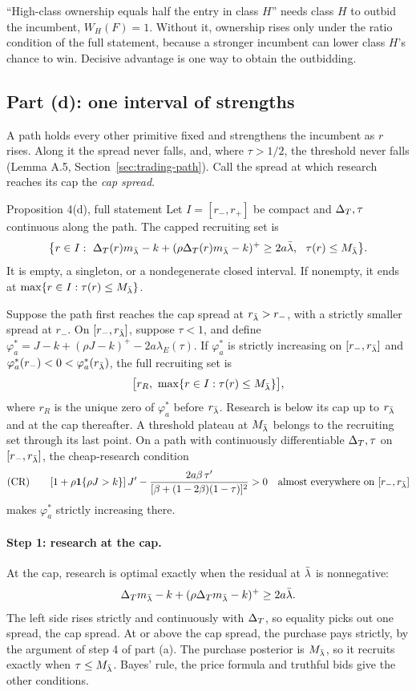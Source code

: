\begin{watchout}
``High-class ownership equals half the entry in class \(H\)'' needs class \(H\) to outbid the incumbent,
\(W_H(F)=1\). Without it, ownership rises only under the ratio condition of the full statement, because a stronger
incumbent can lower class \(H\)'s chance to win. Decisive advantage is one way to obtain the outbidding.
\end{watchout}

\subsection{Part (d): one interval of strengths}

A path holds every other primitive fixed and strengthens the incumbent as \(r\) rises. Along it the spread never
falls, and, where \(\tau>1/2\), the threshold never falls (Lemma A.5, Section~\ref{sec:trading-path}). Call the
spread at which research reaches its cap the \emph{cap spread}.

\begin{paperresult}{Proposition 4(d), full statement}
Let \(I=[r_-,r_+]\) be compact and \(\Delta_T,\tau\) continuous along the path. The capped recruiting set is
\[
\bigl\{r\in I:\ \DT(r)m_{\lb}-k+(\rho\DT(r)m_{\lb}-k)^+\ge2a\lb,\ \ \tau(r)\le M_{\lb}\bigr\}.
\]
It is empty, a singleton, or a nondegenerate closed interval. If nonempty, it ends at \(\max\{r\in I:\tau(r)\le M_{\bar\lambda}\}\).

Suppose the path first reaches the cap spread at \(r_{\bar\lambda}>r_-\), with a strictly smaller spread at \(r_-\). On
\([r_-,r_{\bar\lambda}]\), suppose \(\tau<1\), and define \(\varphi_a^*=J-k+(\rho J-k)^+-2a\lambda_E(\tau)\). If \(\varphi_a^*\)
is strictly increasing on \([r_-,r_{\bar\lambda}]\) and \(\varphi_a^*(r_-)<0<\varphi_a^*(r_{\bar\lambda})\), the full recruiting set is
\[
\bigl[r_R,\ \max\{r\in I:\tau(r)\le M_{\lb}\}\bigr],
\]
where \(r_R\) is the unique zero of \(\varphi_a^*\) before \(r_{\bar\lambda}\). Research is below its cap up to \(r_{\bar\lambda}\) and at
the cap thereafter. A threshold plateau at \(M_{\bar\lambda}\) belongs to the recruiting set through its last point. On a path
with continuously differentiable \(\Delta_T,\tau\) on \([r_-,r_{\bar\lambda}]\), the cheap-research condition
\[
\text{(CR)}\qquad [1+\rho\mathbf{1}\{\rho J>k\}]\,J'-\frac{2a\beta\,\tau'}{[\beta+(1-2\beta)(1-\tau)]^2}>0
\quad\text{almost everywhere on }[r_-,r_{\bar\lambda}]
\]
makes \(\varphi_a^*\) strictly increasing there.
\end{paperresult}

\paragraph{Step 1: research at the cap.} At the cap, research is optimal exactly when the residual at \(\bar\lambda\) is
nonnegative:
\[
\Delta_T m_{\bar\lambda}-k+(\rho\Delta_T m_{\bar\lambda}-k)^+\ge2a\bar\lambda .
\]
The left side rises strictly and continuously with \(\Delta_T\), so equality picks out one spread, the cap spread. At or
above the cap spread, the purchase pays strictly, by the argument of step 4 of part (a). The purchase posterior is
\(M_{\bar\lambda}\), so it recruits exactly when \(\tau\le M_{\bar\lambda}\). Bayes' rule, the price formula and truthful bids give the
other conditions.

